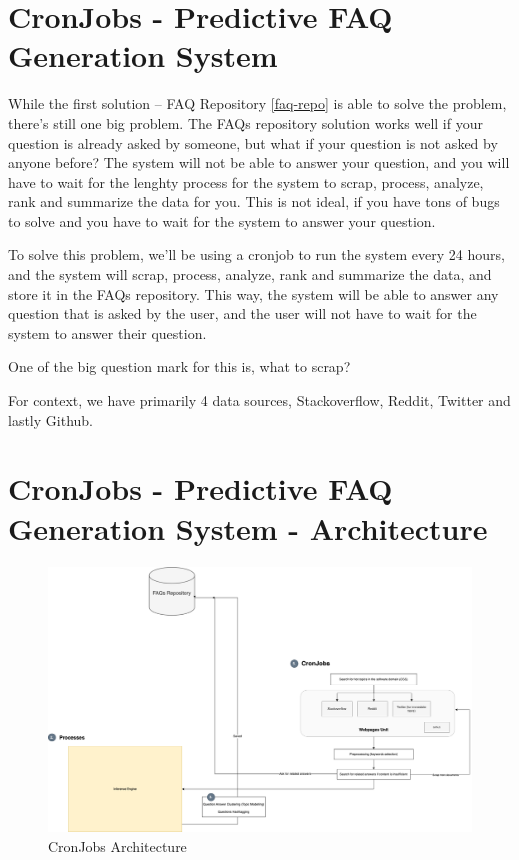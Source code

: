\section{CronJobs - Predictive FAQ Generation System}
While the first solution -- FAQ Repository \ref*{faq-repo} is able to solve the problem, there's still one big problem. The FAQs repository solution works well if your question is already asked by someone, but what if your question is not asked by anyone before? The system will not be able to answer your question, and you will have to wait for the lenghty process for the system to scrap, process, analyze, rank and summarize the data for you. This is not ideal, if you have tons of bugs to solve and you have to wait for the system to answer your question.

To solve this problem, we'll be using a cronjob to run the system every 24 hours, and the system will scrap, process, analyze, rank and summarize the data, and store it in the FAQs repository. This way, the system will be able to answer any question that is asked by the user, and the user will not have to wait for the system to answer their question.

One of the big question mark for this is, what to scrap? 

For context, we have primarily 4 data sources, Stackoverflow, Reddit, Twitter and lastly Github. 

\section{CronJobs - Predictive FAQ Generation System - Architecture}
\newpage
\begin{landscape}
\begin{figure}[t]
  \noindent \includegraphics[scale=0.4, angle=0]{assets/cron_job_workflow.png}
\caption{CronJobs Architecture}\label{cronjobs_architecture}
\end{figure}
\end{landscape}
\newpage

